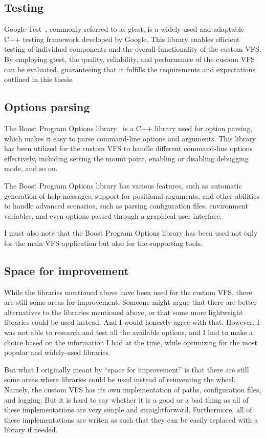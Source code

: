 \subsection{Testing}\label{subsec:gtest}

Google Test~\cite{google_test}, commonly referred to as gtest, is a widely-used and adaptable C++ testing framework developed by Google.
This library enables efficient testing of individual components and the overall functionality of the custom VFS\@.
By employing gtest, the quality, reliability, and performance of the custom VFS can be evaluated, guaranteeing that it fulfills the requirements and expectations outlined in this thesis.

\subsection{Options parsing}\label{subsec:options-parsing}

The Boost Program Options library~\cite{boost_program_options} is a C++ library used for option parsing, which makes it easy to parse command-line options and arguments.
This library has been utilized for the custom VFS to handle different command-line options effectively, including setting the mount point, enabling or disabling debugging mode, and so on.

The Boost Program Options library has various features, such as automatic generation of help messages, support for positional arguments, and other abilities to handle advanced scenarios, such as parsing configuration files, environment variables, and even options passed through a graphical user interface.

I must also note that the Boost Program Options library has been used not only for the main VFS application but also for the supporting tools.

\subsection{Space for improvement}\label{subsec:libs-space-for-improvement}

While the libraries mentioned above have been used for the custom VFS, there are still some areas for improvement.
Someone might argue that there are better alternatives to the libraries mentioned above, or that some more lightweight libraries could be used instead.
And I would honestly agree with that.
However, I was not able to research and test all the available options, and I had to make a choice based on the information I had at the time, while optimizing for the most popular and widely-used libraries.

But what I originally meant by ``space for improvement'' is that there are still some areas where libraries could be used instead of reinventing the wheel.
Namely, the custom VFS has its own implementation of paths, configuration files, and logging.
But it is hard to say whether it is a good or a bad thing as all of these implementations are very simple and straightforward.
Furthermore, all of these implementations are writen as such that they can be easily replaced with a library if needed.